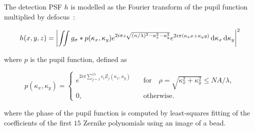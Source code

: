 \documentclass[a0paper,portrait,fontscale=0.35]{baposter}
\theoremstyle{plain}
\theoremstyle{plain}
\theoremstyle{definition}
\theoremstyle{plain}
\theoremstyle{definition}
\begin{document}
\begin{poster}
{  \begin{minipage}[t]{\textwidth}
    The detection PSF $h$ is modelled as the Fourier
    transform of the pupil function multiplied by 
    defocus~\cite{Stokseth1969}: 
    \begin{tcolorbox}[colback=teal!10!white,colframe=white]
      \vspace{-1em}
      \begin{equation}
        h(x,y,z) = \left|
          \iint g_{\sigma} * p(\kappa_x,\kappa_y) e^{
            2 i \pi z 
            \sqrt{(n/\lambda)^2 - \kappa_x^2 - \kappa_y^2}
          }
          e^{
            2 i \pi (\kappa_x x + \kappa_y y)
          }
          \dif \kappa_x \dif \kappa_y
        \right|^2
        \label{eq:psf model}
      \end{equation}
    \end{tcolorbox}
    where $p$ is the pupil function, defined as
    \begin{tcolorbox}[colback=teal!10!white,colframe=white]
      \begin{equation}
        p(\kappa_x,\kappa_y) = \begin{cases}
          e^{2i\pi \sum_{j=1}^{15} c_i Z_j(\kappa_x,\kappa_y)}
          \quad
            &\text{for} \quad
            \rho = \sqrt{\kappa_x^2 + \kappa_y^2} \leq NA/\lambda,\\
            0, \quad &\text{otherwise.}
        \end{cases}
      \end{equation}
    \end{tcolorbox}
    where the phase of the pupil function is computed by least-squares
    fitting of the coefficients of the first $15$ Zernike polynomials
    using an image of a bead.
  \end{minipage}

}
\end{poster}
\end{document}
